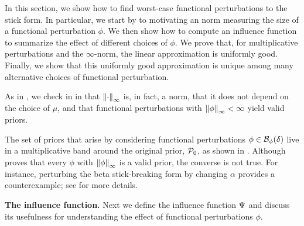 In this section, we show how to find worst-case functional perturbations to the
stick form. In particular, we start by  to motivating an norm measuring the size
of a functional perturbation $\phi$. We then show how to compute an influence
function to summarize the effect of different choices of $\phi$. We prove that,
for multiplicative perturbations and the $\infty$-norm, the linear approximation
is uniformly good. Finally, we show that this uniformly good approximation is
unique among many alternative choices of functional perturbation.

As in \citep{gustafson:1996:marginal}, we check in  in
 that $\left\Vert\cdot\right\Vert_{\infty}$ is, in fact, a norm, that
it does not depend on the choice of $\mu$, and that functional perturbations
with $\left\Vert\phi\right\Vert_{\infty} < \infty$ yield valid priors. 

The set of priors that arise by considering functional perturbations $\phi \in
\mathcal{B}_\phi(\delta)$ live in a multiplicative band around the original prior,
$\mathcal{P}_{0}$, as shown in . Although 
proves that every $\phi$ with $\left\Vert\phi\right\Vert_{\infty}$ is a valid prior, the converse is
not true. For instance, perturbing the beta stick-breaking form by changing
$\alpha$ provides a counterexample; see  for more details.

\LinfExamplesFig{}

\noindent \textbf{The influence function.}
%
Next we define the influence function $\Psi$ and discuss its usefulness for
understanding the effect of functional perturbations $\phi$.

